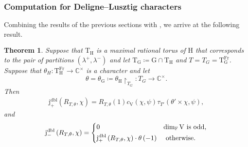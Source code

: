 \documentclass[12pt, reqno]{amsart}
\newtheorem{theorem}{Theorem}[section]
\theoremstyle{definition}
\theoremstyle{definition}
\theoremstyle{definition}
\newcommand{\cComplex}{\mathbb{C}}
\newcommand{\multiplicativegroup}[1]{#1^{\times}}
\newcommand{\hermitianSpace}{\mathrm{V}}
\newcommand{\fieldCharacter}{\psi}
\newcommand{\finiteField}{\mathbb{F}}
\newcommand{\Frobenius}{\operatorname{Fr}}
\newcommand{\dblPosVirtualJacobiSumScalar}[2]{\mathrm{j}_{+}^{\mathrm{dbl}}\left(#1, #2\right)}
\newcommand{\dblNegVirtualJacobiSumScalar}[2]{\mathrm{j}_{-}^{\mathrm{dbl}}\left(#1, #2\right)}
\newcommand{\GaussSumTorusCharacter}[4]{\tau_{#1}\left(#2 \times #3, #4\right)}
\newcommand{\algebraicGroup}[1]{\boldsymbol{\mathrm{#1}}}
\begin{document}
\subsubsection{Computation for Deligne--Lusztig characters}
Combining the results of the previous sections with , we arrive at the following result.

\begin{theorem}\label{thm:computation-of-doubling-gauss-sum-scalar-for-deligne-lusztig-characters}
	Suppose that $\algebraicGroup{T}_{\algebraicGroup{H}}$ is a maximal rational torus of $\algebraicGroup{H}$ that corresponds to the pair of partitions $\left(\lambda^+, \lambda^-\right)$ and let $\algebraicGroup{T}_{\algebraicGroup{G}} \coloneq \algebraicGroup{G} \cap \algebraicGroup{T}_{\algebraicGroup{H}}$ and $T = T_G = \algebraicGroup{T}_{\algebraicGroup{G}}^{\Frobenius}$. Suppose that $\theta_{H} \colon \algebraicGroup{T}_{\algebraicGroup{H}}^{\Frobenius} \to \multiplicativegroup{\cComplex}$ is a character and let $$\theta = \theta_{\algebraicGroup{G}} \coloneq \theta_{\algebraicGroup{H}} \restriction_{T_G} \colon T_G \to \multiplicativegroup{\cComplex}.$$ Then
	\begin{align*}
		 \dblPosVirtualJacobiSumScalar{R_{T, \theta}}{\chi} = R_{T,\theta}\left(1\right) c_{\hermitianSpace}\left(\chi, \fieldCharacter\right) \GaussSumTorusCharacter{T'}{\theta'}{\chi}{\fieldCharacter},
	\end{align*}
	and \begin{align*}
		\dblNegVirtualJacobiSumScalar{R_{T, \theta}}{\chi} = \begin{dcases}
			0 & \dim_{\finiteField} \hermitianSpace \text{ is odd,}\\
			\dblPosVirtualJacobiSumScalar{R_{T, \theta}}{\chi} \cdot \theta\left(-1\right) & \text{ otherwise.}
		\end{dcases}
	\end{align*}
\end{theorem}
\end{document}
